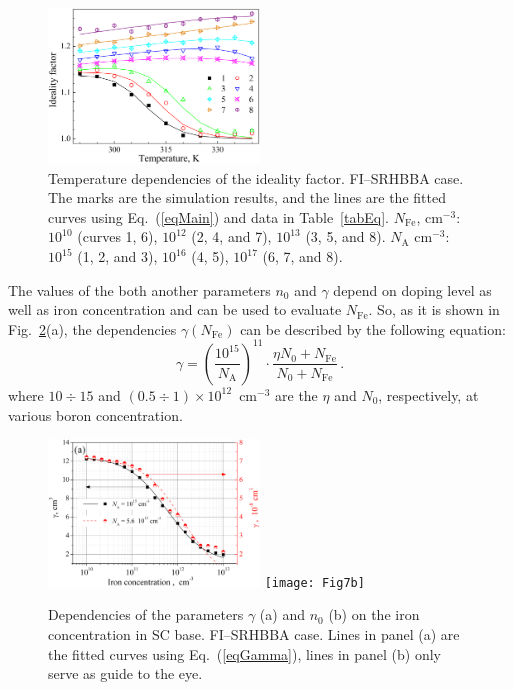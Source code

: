 \documentclass [sort&compress] {elsarticle}
\begin{document}
\begin{figure}
\includegraphics[width=0.5\textwidth]{Fig6}%
\caption{\label{fig6}
Temperature dependencies of the ideality factor.
FI--SRHBBA case.
The marks are the simulation results, and the lines are the fitted curves using Eq.~(\ref{eqMain}) and data in Table~\ref{tabEq}.
$N_\mathrm{Fe}$, cm$^{-3}$: $10^{10}$ (curves 1, 6), $10^{12}$ (2, 4, and 7), $10^{13}$ (3, 5, and 8).
$N_\mathrm{A}$ cm$^{-3}$: $10^{15}$ (1, 2, and 3), $10^{16}$ (4,  5), $10^{17}$ (6, 7, and 8).
}%
\end{figure}

The values of the both another parameters $n_0$ and $\gamma$ depend on doping level as well as iron concentration and can be used to evaluate $N_\mathrm{Fe}$.
So, as it is shown in Fig.~\ref{fig7}(a), the dependencies $\gamma(N_\mathrm{Fe})$ can be described by the following equation:
\begin{equation}
\label{eqGamma}
    \gamma=\left(\frac{10^{15}}{N_\mathrm{A}}\right)^{11}\cdot \frac{\eta N_0+N_\mathrm{Fe}}{N_0+N_\mathrm{Fe}}\,.
\end{equation}
where
$10\div15$ and $(0.5\div1)\times10^{12}$~cm$^{-3}$ are the $\eta$ and $N_0$, respectively, at various boron concentration.


\begin{figure}
\includegraphics[width=0.5\textwidth]{Fig7a}%
\texttt{[image: Fig7b]}
\caption{\label{fig7}
Dependencies of the parameters $\gamma$ (a) and $n_0$ (b) on the iron concentration in SC base.
FI--SRHBBA  case.
Lines in panel (a) are the fitted curves using Eq.~(\ref{eqGamma}), lines in panel (b) only
serve as guide to the eye.
}%
\end{figure}
\end{document}
